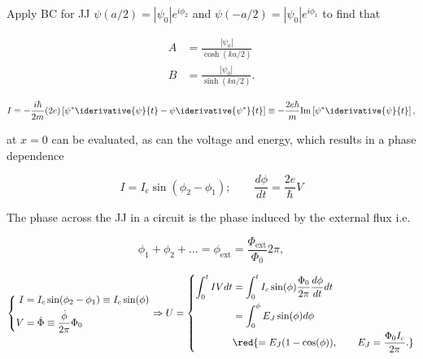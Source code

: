    \noindent           Apply            BC           for           JJ
   $\psi(a/2)       =       \left|\psi_0\right|e^{i\phi_2}$       and
   $\psi(-a/2) = \left|\psi_0\right|e^{i\phi_1}$ to find that

   \begin{align}
     A &= \frac{\left|\psi_0\right|}{\cosh(ka/2)}\\
     B &= \frac{\left|\psi_0\right|}{\sinh(ka/2)}.
   \end{align}


   \begin{equation}
     I = -\frac{i\hbar}{2m}(2e)\left[\psi^*\iderivative{\psi}{t}-\psi\iderivative{\psi^*}{t}\right] \equiv -\frac{2e\hbar}{m}\text{Im}\left[\psi^*\iderivative{\psi}{t}\right],
   \end{equation}

   \noindent  at $x=0$  can  be  evaluated, as  can  the voltage  and
   energy, which results in a phase dependence

   \begin{equation}
     \label{eq:jj-current-and-voltage}
     I = I_c\sin(\phi_2-\phi_1); \qquad \frac{d\phi}{dt} = \frac{2e}{\hbar}V
   \end{equation}

   The phase across the  JJ in a circuit is the  phase induced by the
   external flux i.e.

   \begin{equation}
     \label{eqn:l2-phasesum}
     \phi_1+\phi_2+\ldots = \phi_\text{ext} = \frac{\Phi_\text{ext}}{\Phi_0}2\pi,
   \end{equation}

   \begin{equation}
     \left\lbrace\begin{aligned}
         I &= I_c\sin(\phi_2-\phi_1)\equiv I_c\sin(\phi)\\
         V&=\dot{\Phi} \equiv \frac{\dot{\phi}}{2\pi}\Phi_0
       \end{aligned}\right.  \Rightarrow U =
     \left\lbrace\begin{aligned}
         \int_{0}^{t}IV dt & = \int_{0}^{t}I_c\sin(\phi)\frac{\Phi_0}{2\pi}\frac{d\phi}{dt}dt\\
         & = \int_{0}^{\phi} E_J\sin(\phi)d\phi\\
         &       \red{=       E_J(1-\cos(\phi)),\qquad       E_J       =
           \frac{\Phi_0I_c}{2\pi}.}
       \end{aligned}\right.
     \label{l2-JJEnergy}
   \end{equation}

